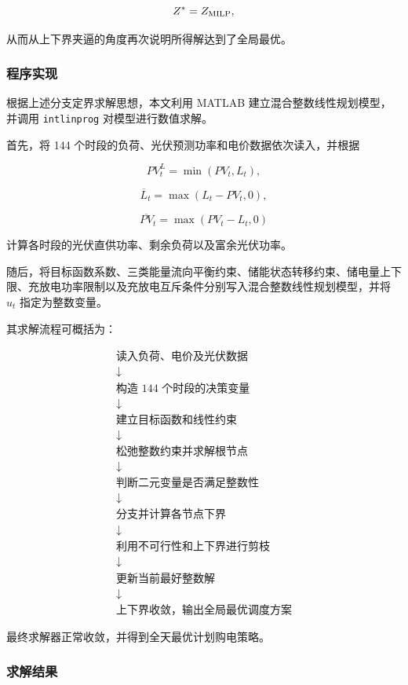 \[
Z^*=Z_{\rm MILP},
\]

从而从上下界夹逼的角度再次说明所得解达到了全局最优。

\subsubsection{程序实现}

根据上述分支定界求解思想，本文利用 MATLAB 建立混合整数线性规划模型，并调用 \texttt{intlinprog} 对模型进行数值求解。

首先，将 144 个时段的负荷、光伏预测功率和电价数据依次读入，并根据

\[
PV_t^{L}=\min(PV_t,L_t),
\]

\[
\overline L_t=\max(L_t-PV_t,0),
\]

\[
\overline{PV}_t=\max(PV_t-L_t,0)
\]

计算各时段的光伏直供功率、剩余负荷以及富余光伏功率。

随后，将目标函数系数、三类能量流向平衡约束、储能状态转移约束、储电量上下限、充放电功率限制以及充放电互斥条件分别写入混合整数线性规划模型，并将 \(u_t\) 指定为整数变量。

其求解流程可概括为：

\[
\boxed{
\begin{array}{c}
\text{读入负荷、电价及光伏数据}\\
\downarrow\\
\text{构造 144 个时段的决策变量}\\
\downarrow\\
\text{建立目标函数和线性约束}\\
\downarrow\\
\text{松弛整数约束并求解根节点}\\
\downarrow\\
\text{判断二元变量是否满足整数性}\\
\downarrow\\
\text{分支并计算各节点下界}\\
\downarrow\\
\text{利用不可行性和上下界进行剪枝}\\
\downarrow\\
\text{更新当前最好整数解}\\
\downarrow\\
\text{上下界收敛，输出全局最优调度方案}
\end{array}}
\]

最终求解器正常收敛，并得到全天最优计划购电策略。

\subsubsection{求解结果}

